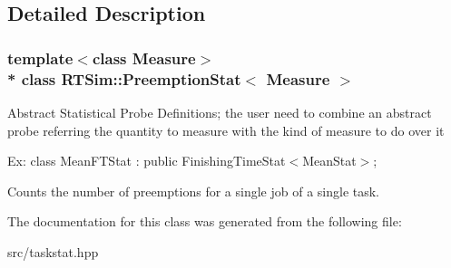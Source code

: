 \subsection{Detailed Description}
\subsubsection*{template$<$class Measure$>$\\*
class R\+T\+Sim\+::\+Preemption\+Stat$<$ Measure $>$}

Abstract Statistical Probe Definitions; the user need to combine an abstract probe referring the quantity to measure with the kind of measure to do over it

Ex\+: class Mean\+F\+T\+Stat \+: public Finishing\+Time\+Stat$<$\+Mean\+Stat$>$;

Counts the number of preemptions for a single job of a single task. 

The documentation for this class was generated from the following file\+:\begin{DoxyCompactItemize}
\item 
src/taskstat.\+hpp\end{DoxyCompactItemize}

